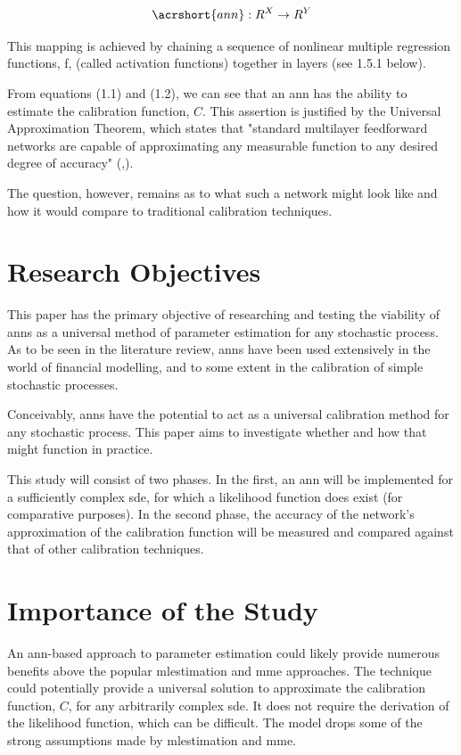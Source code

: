 \documentclass[11pt,oneside,openany,a4paper,english, report, goldenblock
]{usthesis}
\begin{document}
\begin{equation}
\acrshort{ann}: R^X \rightarrow R^Y
\end{equation}

This mapping is achieved by chaining a sequence of nonlinear multiple regression functions, f, (called activation functions) together in layers (see 1.5.1 below).


From equations (1.1) and (1.2), we can see that an \acrshort{ann} has the ability to estimate the calibration function, $ C $. 
This assertion is justified by the Universal Approximation Theorem, which states that "standard multilayer feedforward networks are capable of approximating any measurable function to any desired degree of accuracy" (,\citeyear{Hornik}).


The question, however, remains as to what such a network might look like and how it would compare to traditional calibration techniques.

\section{Research Objectives}
This paper has the primary objective of researching and testing the viability of \acrshort{ann}s as a universal method of parameter estimation for any stochastic process. As to be seen in the literature review, \acrshort{ann}s have been used extensively in the world of financial modelling, and to some extent in the calibration of simple stochastic processes.


Conceivably, \acrshort{ann}s have the potential to act as a universal calibration method for any stochastic process. This paper aims to investigate whether and how that might function in practice.


This study will consist of two phases. In the first, an \acrshort{ann} will be implemented for a sufficiently complex \acrshort{sde}, for which a likelihood function does exist (for comparative purposes). In the second phase, the accuracy of the network's approximation of the calibration function will be measured and compared against that of other calibration techniques.

\section{Importance of the Study}

An \acrshort{ann}-based approach to parameter estimation could likely provide numerous benefits above the popular \acrshort{mlestimation} and \acrshort{mme} approaches.
The technique could potentially provide a universal solution to approximate the calibration function, $C$, for any arbitrarily complex \acrshort{sde}.
It does not require the derivation of the likelihood function, which can be difficult.
The model drops some of the strong assumptions made by \acrshort{mlestimation} and \acrshort{mme}. 
\end{document}
